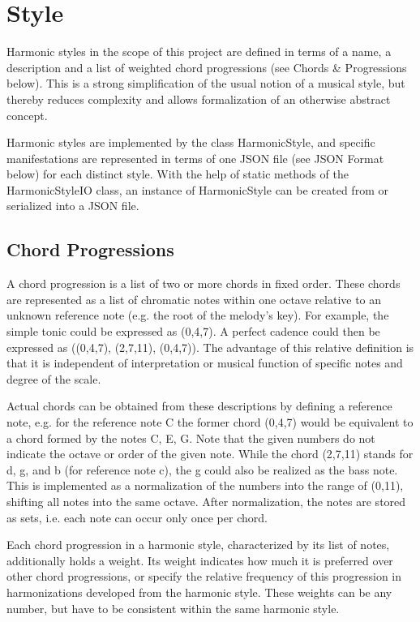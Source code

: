 
\section{Style}
Harmonic styles in the scope of this project are defined in terms of a name, a description and a list of weighted chord progressions (see Chords \& Progressions below). This is a strong simplification of the usual notion of a musical style, but thereby reduces complexity and allows formalization of an otherwise abstract concept.

Harmonic styles are implemented by the class HarmonicStyle, and specific manifestations are represented in terms of one JSON file (see JSON Format below) for each distinct style. With the help of static methods of the HarmonicStyleIO class, an instance of HarmonicStyle can be created from or serialized into a JSON file.

\subsection{Chord Progressions}
A chord progression is a list of two or more chords in fixed order. These chords are represented as a list of chromatic notes within one octave relative to an unknown reference note (e.g. the root of the melody's key). For example, the simple tonic could be expressed as (0,4,7). A perfect cadence could then be expressed as ((0,4,7), (2,7,11), (0,4,7)). The advantage of this relative definition is that it is independent of interpretation or musical function of specific notes and degree of the scale.

Actual chords can be obtained from these descriptions by defining a reference note, e.g. for the reference note C the former chord (0,4,7) would be equivalent to a chord formed by the notes C, E, G. Note that the given numbers do not indicate the octave or order of the given note. While the chord (2,7,11) stands for d, g, and b (for reference note c), the g could also be realized as the bass note. This is implemented as a normalization of the numbers into the range of (0,11), shifting all notes into the same octave. After normalization, the notes are stored as sets, i.e. each note can occur only once per chord.

Each chord progression in a harmonic style, characterized by its list of notes, additionally holds a weight. Its weight indicates how much it is preferred over other chord progressions, or specify the relative frequency of this progression in harmonizations developed from the harmonic style. These weights can be any number, but have to be consistent within the same harmonic style.

